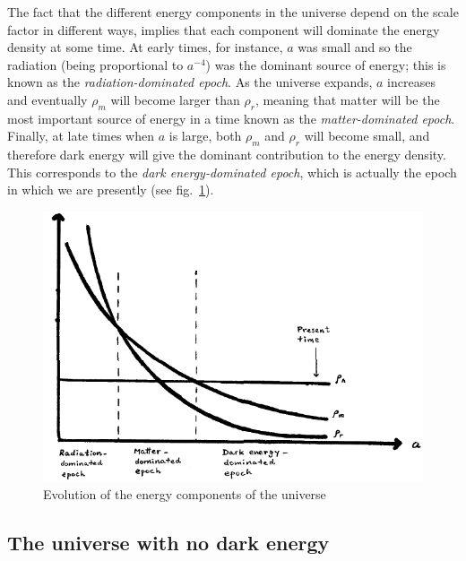 The fact that the different energy components in the universe depend on the scale factor in different ways, implies that each component will dominate the energy density at some time. At early times, for instance, $a$ was small and so the radiation (being proportional to $a^{-4}$) was the dominant source of energy; this is known as the {\it radiation-dominated epoch}. As the universe expands, $a$ increases and eventually $\rho_m$ will become larger than $\rho_r$, meaning that matter will be the most important source of energy in a time known as the {\it matter-dominated epoch}. Finally, at late times when $a$ is large, both $\rho_m$ and $\rho_r$ will become small, and therefore dark energy will give the dominant contribution to the energy density. This corresponds to the {\it dark energy-dominated epoch}, which is actually the epoch in which we are presently (see fig.\ \ref{fig:lec6_2}).
\begin{figure}[ht]
\begin{center}
\includegraphics[scale=0.6]{Draw/lec6_2.png}
\end{center}
\caption{Evolution of the energy components of the universe}
\label{fig:lec6_2}
\end{figure}

\subsection{The universe with no dark energy}

